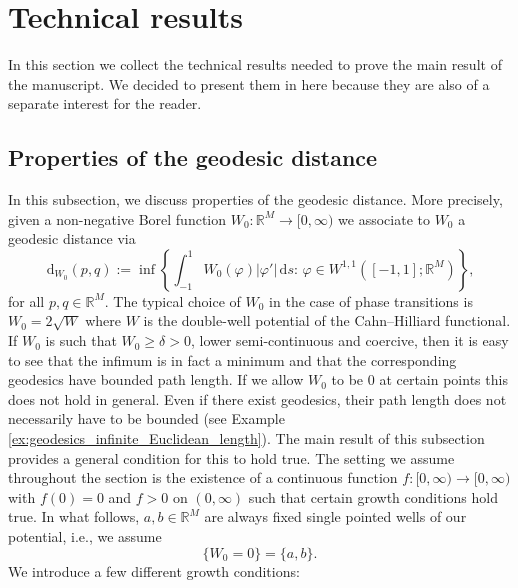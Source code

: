 \documentclass[a4paper, 11pt, reqno]{amsart}
\theoremstyle{plain}
\theoremstyle{definition}
\theoremstyle{remark}
\newcommand{\R}{\mathbb R}
\newcommand{\dd}{\,\mathrm{d}}
\begin{document}
\section{Technical results}

In this section we collect the technical results needed to prove the main result of the manuscript. We decided to present them in here because they are also of a separate interest for the reader.




\subsection{Properties of the geodesic distance}

In this subsection, we discuss properties of the geodesic distance. More precisely, given a non-negative Borel function $W_0: \R^M \to [0, \infty)$ we associate to $W_0$ a geodesic distance via 
\[
    \dd_{W_0}(p,q) := \inf\left\{ \int_{-1}^1 W_0(\varphi)|\varphi'| \, \mathrm{d}s :\, \varphi \in W^{1,1}\left([-1,1]; \R^M \right) \right\},
\]
for all $p,q \in \R^M$.
The typical choice of $W_0$ in the case of phase transitions is $W_0 = 2\sqrt W$ where $W$ is the double-well potential of the Cahn--Hilliard functional. If $W_0$ is such that $W_0 \geq \delta >0$, lower semi-continuous and coercive, then it is easy to see that the infimum is in fact a minimum and that the corresponding geodesics have bounded path length. If we allow $W_0$ to be $0$ at certain points this does not hold in general. Even if there exist geodesics, their path length does not necessarily have to be bounded (see Example \ref{ex:geodesics_infinite_Euclidean_length}). The main result of this subsection provides a general condition for this to hold true. The setting we assume throughout the section is the existence of a continuous function $f\colon [0,\infty) \to [0, \infty)$ with $f(0) = 0$ and $f > 0$ on $(0,\infty)$ such that certain growth conditions hold true. In what follows, $a,b \in \R^M$ are always fixed single pointed wells of our potential, i.e., we assume 
$$
    \{ W_0 = 0\} = \{a,b\}.
$$
We introduce a few different growth conditions:   
\end{document}
